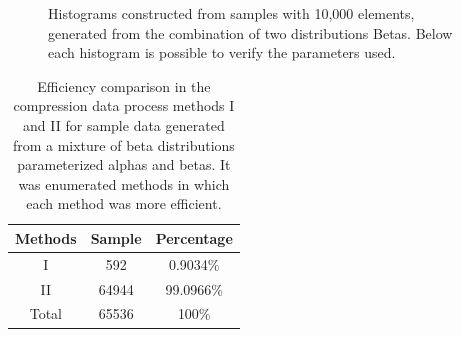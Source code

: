 \documentclass[10pt]{article}
\begin{document}
\begin{figure}[h]
{  }
  \caption{Histograms constructed from samples with 10,000 elements, generated from the combination of two distributions Betas. Below each histogram is possible to verify the parameters used.}
  \label{fig:02B}
\end{figure}

\begin{table}[h]
 \centering
 \caption{Efficiency comparison in the compression data process methods I and II for sample data generated from a mixture of beta distributions parameterized alphas and betas. It was enumerated methods in which each method was more efficient.}
 \begin{tabular}{ccc}
  \hline 
  Methods  & Sample   & Percentage \\
  \hline
  I	   & 592	& 0.9034\% \\
  II	   & 64944	& 99.0966\% \\
  \hline
  Total    & 65536	& 100\% \\
  \hline
 \end{tabular}
 \label{tab:06}
\end{table}
\end{document}
